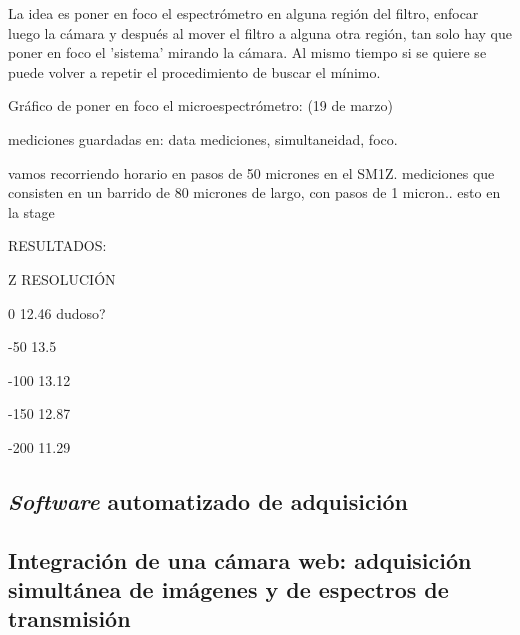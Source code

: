 La idea es poner en foco el espectrómetro en alguna región del filtro, enfocar luego la cámara y después al mover el filtro a alguna otra región, tan solo hay que poner en foco el 'sistema' mirando la cámara. Al mismo tiempo si se quiere se puede volver a repetir el procedimiento de buscar el mínimo.


Gráfico de poner en foco el microespectrómetro: (19 de marzo)

mediciones guardadas en: data mediciones, simultaneidad, foco.

vamos recorriendo horario en pasos de 50 micrones en el SM1Z.
mediciones que consisten en un barrido de 80 micrones de largo, con pasos de 1 micron.. esto en la stage


RESULTADOS:

Z                  RESOLUCIÓN

0                  12.46 dudoso?

-50               13.5

-100             13.12

-150              12.87

-200              11.29


\singlespacing
\subsection{\textit{Software} automatizado de adquisición}
\label{sec:softadq}


\singlespacing
\subsection{Integración de una cámara web: adquisición simultánea de imágenes y de espectros de transmisión}
\label{sec:camwebgui}


